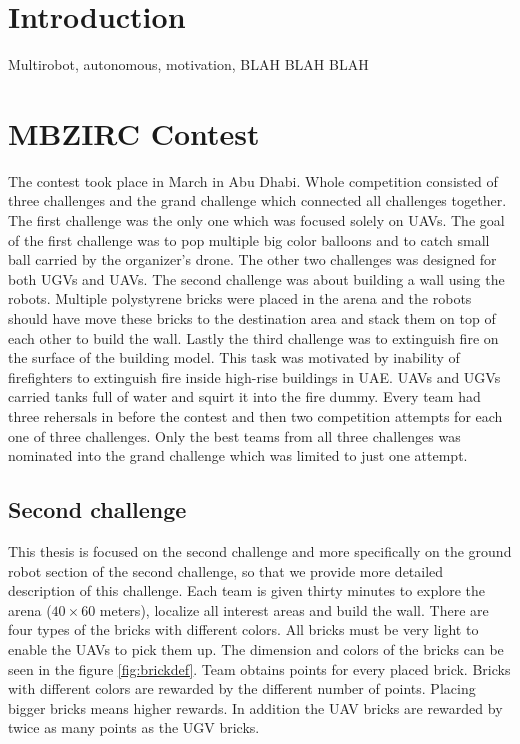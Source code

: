 \section{Introduction}
Multirobot, autonomous, motivation, BLAH BLAH BLAH


\section{MBZIRC Contest}
The contest took place in March in Abu Dhabi. Whole competition consisted of three challenges and the grand challenge which connected all challenges together. The first challenge was the only one which was focused solely on UAVs. The goal of the first challenge was to pop multiple big color balloons and to catch small ball carried by the organizer's drone. The other two challenges was designed for both UGVs and UAVs. The second challenge was about building a wall using the robots. Multiple polystyrene bricks were placed in the arena and the robots should have move these bricks to the destination area and stack them on top of each other to build the wall. Lastly the third challenge was to extinguish fire on the surface of the building model. This task was motivated by inability of firefighters to extinguish fire inside high-rise buildings in UAE. UAVs and UGVs carried tanks full of water and squirt it into the fire dummy. Every team had three rehersals in before the contest and then two competition attempts for each one of three challenges. Only the best teams from all three challenges was nominated into the grand challenge which was limited to just one attempt.

\subsection{Second challenge}
This thesis is focused on the second challenge and more specifically on the ground robot section of the second challenge, so that we provide more detailed description of this challenge. Each team is given thirty minutes to explore the arena ($40 \times 60$ meters), localize all interest areas and build the wall. There are four types of the bricks with different colors. All bricks must be very light to enable the UAVs to pick them up. The dimension and colors of the bricks can be seen in the figure \ref{fig:brickdef}. Team obtains points for every placed brick. Bricks with different colors are rewarded by the different number of points. Placing bigger bricks means higher rewards. In addition the UAV bricks are rewarded by twice as many points as the UGV bricks.

